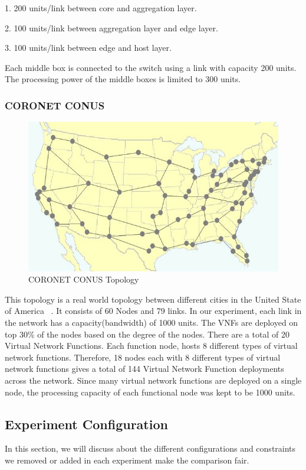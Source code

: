1. 200 units/link between core and aggregation layer.

2. 100 units/link between aggregation layer and edge layer.

3. 100 units/link between edge and host layer. 

Each middle box is connected to the switch using a link with capacity 200 units. The processing power of the middle boxes is limited to 300 units. 

\subsubsection{CORONET CONUS}
\begin{figure}[ht]
\vskip 0.2in
\begin{center}
\centerline{\includegraphics[width=\columnwidth]{Report//graphs/coro.jpg}}
\caption{CORONET CONUS Topology ~\cite{ref:coronus}}
\label{pruning}
\end{center}
\vskip -0.2in
\end{figure}
This topology is a real world topology between different cities in the United State of America ~\cite{ref:coronus}. It consists of 60 Nodes and 79 links. In our experiment, each link in the network has a capacity(bandwidth) of 1000 units. The VNFs are deployed on top 30\% of the nodes based on the degree of the nodes. There are a total of 20 Virtual Network Functions. Each function node, hosts 8 different types of virtual network functions. Therefore, 18 nodes each with 8 different types of virtual network functions gives a total of 144 Virtual Network Function deployments across the network. Since many virtual network functions are deployed on a single node, the processing capacity of each functional node was kept to be 1000 units. 

\subsection{Experiment Configuration}
In this section, we will discuss about the different configurations and constraints we removed or added in each experiment make the comparison fair. 

